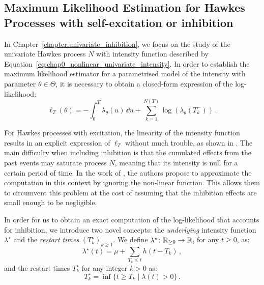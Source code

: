     \subsection{Maximum Likelihood Estimation for Hawkes Processes with self-excitation or inhibition}
    
    In Chapter~\ref{chapter:univariate_inhibition}, we focus on the study of the univariate Hawkes process $N$ with intensity function described by Equation~\eqref{eq:chap0_nonlinear_univariate_intensity}.
    In order to establish the maximum likelihood estimator for a parametrised model of the intensity with parameter $\theta\in\Theta$, 
    it is necessary to obtain a closed-form expression of the log-likelihood:
    \[\ell_T(\theta) = - \int_{0}^{T}{\lambda_\theta(u)\,\dd u} + \sum_{k=1}^{N(T)}{\log(\lambda_\theta(T_k^-))}\,.\]
    
    For Hawkes processes with excitation, the linearity of the intensity function results in an explicit expression of $\ell_T$ without much trouble, as shown in \textcite{Ozaki1979}.
    The main difficulty when including inhibition is that the cumulated effects from the past events may saturate process $N$, meaning that its intensity is null for a certain period of time.
    In the work of \textcite{Lemonnier2014}, the authors propose to approximate the computation in this context by ignoring the non-linear function.
    This allows them to circumvent this problem at the cost of assuming that the inhibition effects are small enough to be negligible.

    In order for us to obtain an exact computation of the log-likelihood that accounts for inhibition, we introduce two novel concepts: the \emph{underlying} intensity function $\lambda^\star$ and the \emph{restart times} $(T_k^\star)_{k\geq 1}$.
    We define $\lambda^\star\colon {\mathbb R}_{\geq 0}\to {\mathbb R}$, for any $t\geq 0$, as:
    \[\lambda^\star(t) = \mu + \sum_{T_k \leq t}{h(t-T_k)}\,,\]
    and the restart times $T_k^\star$ for any integer $k>0$ as:
    \[T_k^\star = \inf\{t\geq T_k \mid \lambda(t) > 0\}\,.\]

